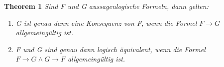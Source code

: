 \textbf{Theorem 1} \textit{Sind F und G aussagenlogische Formeln, dann gelten:}
\begin{enumerate}
	\item \textit{G ist genau dann eine Konsequenz von F, 
		wenn die Formel $F \rightarrow G$ allgemeingültig ist.}
	\item \textit{F und G sind genau dann logisch äquivalent, 
			wenn die Formel $F \rightarrow G \land G \rightarrow F$ allgemeingültig ist.}
\end{enumerate}

